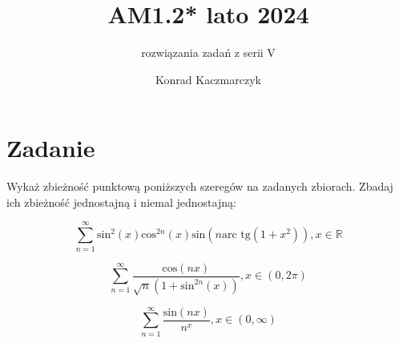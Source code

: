 \documentclass[11pt]{scrartcl}
\author{Konrad Kaczmarczyk}
\begin{document}
  \title{AM1.2* lato 2024}
  \subtitle{rozwiązania zadań z serii V}
  \maketitle
    \section{Zadanie}
        \begin{zadanie}
            Wykaż zbieżność punktową poniższych szeregów na zadanych zbiorach. Zbadaj ich zbieżność jednostajną i niemal jednostajną:
                \begin{walk}
                    \item 
                      \[
                        \sum_{n = 1}^{\infty } \text{sin}^2 \left ( x \right ) \text{cos}^{2n} \left ( x \right ) \text{sin} \left ( n \text{arc tg} \left ( 1 + x^2 \right )  \right ), x \in \mathbb{R}
                      \]
                    \item 
                      \[
                        \sum_{n = 1}^{\infty } \frac{\text{cos} \left ( nx \right ) }{\sqrt{n} \left ( 1 + \text{sin}^{2n} \left ( x \right )  \right ) }, x \in \left ( 0, 2 \pi  \right ) 
                      \]
                    \item 
                      \[
                        \sum_{n = 1}^{\infty }  \frac{\text{sin} \left ( nx \right ) }{n^x}, x \in \left ( 0, \infty  \right )
                      \]
                \end{walk}            
        \end{zadanie}
\end{document}
